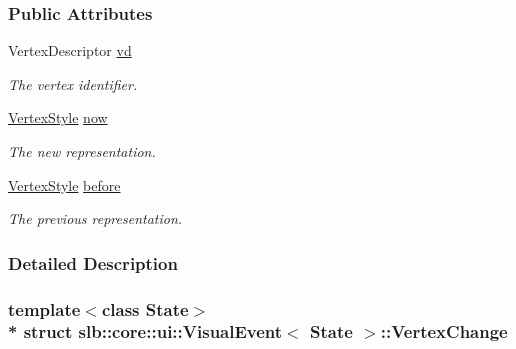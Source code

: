 \subsubsection*{Public Attributes}
\begin{DoxyCompactItemize}
\item 
Vertex\+Descriptor \hyperlink{structslb_1_1core_1_1ui_1_1VisualEvent_1_1VertexChange_aa4a830a6bc6c0f72ffccfe5d5c867a9a}{vd}\hypertarget{structslb_1_1core_1_1ui_1_1VisualEvent_1_1VertexChange_aa4a830a6bc6c0f72ffccfe5d5c867a9a}{}\label{structslb_1_1core_1_1ui_1_1VisualEvent_1_1VertexChange_aa4a830a6bc6c0f72ffccfe5d5c867a9a}

\begin{DoxyCompactList}\small\item\em The vertex identifier. \end{DoxyCompactList}\item 
\hyperlink{structslb_1_1core_1_1ui_1_1VisualEvent_a81ab7d486e4eb9afda92f9e052c3ea56}{Vertex\+Style} \hyperlink{structslb_1_1core_1_1ui_1_1VisualEvent_1_1VertexChange_a5c38febb1b3fc4319f33b3ff9e96e13c}{now}\hypertarget{structslb_1_1core_1_1ui_1_1VisualEvent_1_1VertexChange_a5c38febb1b3fc4319f33b3ff9e96e13c}{}\label{structslb_1_1core_1_1ui_1_1VisualEvent_1_1VertexChange_a5c38febb1b3fc4319f33b3ff9e96e13c}

\begin{DoxyCompactList}\small\item\em The new representation. \end{DoxyCompactList}\item 
\hyperlink{structslb_1_1core_1_1ui_1_1VisualEvent_a81ab7d486e4eb9afda92f9e052c3ea56}{Vertex\+Style} \hyperlink{structslb_1_1core_1_1ui_1_1VisualEvent_1_1VertexChange_a7e81c6679263491fc9f23df2d18172aa}{before}\hypertarget{structslb_1_1core_1_1ui_1_1VisualEvent_1_1VertexChange_a7e81c6679263491fc9f23df2d18172aa}{}\label{structslb_1_1core_1_1ui_1_1VisualEvent_1_1VertexChange_a7e81c6679263491fc9f23df2d18172aa}

\begin{DoxyCompactList}\small\item\em The previous representation. \end{DoxyCompactList}\end{DoxyCompactItemize}


\subsubsection{Detailed Description}
\subsubsection*{template$<$class State$>$\\*
struct slb\+::core\+::ui\+::\+Visual\+Event$<$ State $>$\+::\+Vertex\+Change}

